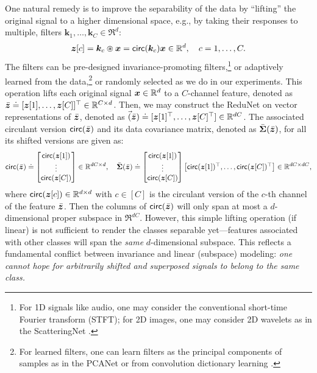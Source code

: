\documentclass[\toplevelprefix/book-main.tex]{subfiles}
\begin{document}
One natural remedy is to improve the separability of the data by ``lifting'' the original signal to a higher dimensional space, e.g., by taking their responses to multiple, filters $\bm k_1, \ldots, \bm k_C \in \Re^d$: 
\begin{equation}
\bm z[c] = \bm k_c \circledast \bm x  =  \mathsf{circ}(\bm k_c) \bm x \in \mathbb{R}^d, \quad c = 1, \ldots, C.
\label{eqn:lift-1d}
\end{equation} 
The filters can be pre-designed invariance-promoting filters,\footnote{For 1D signals like audio, one may consider the conventional short-time Fourier transform (STFT); for 2D images, one may consider 2D wavelets as in the ScatteringNet \cite{scattering-net}.} or adaptively learned from the data,\footnote{For learned filters, one can learn filters as the principal components of samples as in the PCANet \cite{chan2015pcanet} or from convolution dictionary learning \cite{li2019multichannel,qu2019nonconvex}.} or randomly selected as we do in our experiments. This operation lifts each original signal $\bm{x} \in \mathbb{R}^d$ to a $C$-channel feature, denoted as $\bar{\bm{z}}  \doteq [\bm{z}[1], \ldots, \bm{z}[C]]^\top \in \mathbb{R}^{C\times d}$. 
Then, we may construct the ReduNet on vector representations of $\bar{\bm{z}}$, denoted as
$\vec(\bar{\bm{z}}) \doteq [\bm{z}[1]^\top, \ldots, \bm{z}[C]^\top] \in \mathbb{R}^{dC}$. 
The associated circulant version $ \mathsf{circ}(\bar{\bm{z}})$ and its data covariance matrix, denoted as $\bar{\bm \Sigma}(\bar{\bm{z}})$, for all its shifted versions are given as:
\begin{equation}
\begin{aligned}
 \mathsf{circ}(\bar{\bm{z}}) \doteq \left[\begin{matrix}
    \mathsf{circ}(\bm{z}[1])  \\ \vdots \\ \mathsf{circ}(\bm{z}[C]) \end{matrix} \right] \in \mathbb{R}^{dC\times d}, 
    \quad  \bar{\bm \Sigma}(\bar{\bm{z}}) \doteq 
    \left[\begin{matrix}
    \mathsf{circ}(\bm{z}[1]) \\ \vdots \\ \mathsf{circ}(\bm{z}[C]) \end{matrix} \right]
    \left[\begin{matrix}\mathsf{circ}(\bm{z}[1])^\top,\ldots, \mathsf{circ}(\bm{z}[C])^\top\end{matrix} \right] \in \mathbb{R}^{dC\times dC},
    \label{eqn:W-multichannel}
\end{aligned}
\end{equation}
where $\mathsf{circ}(\bm{z}[c]) \in \mathbb{R}^{d\times d}$ with $c \in [C]$ is the circulant version of the $c$-th channel of the feature $\bar {\bm{z}}$. Then the columns of $\mathsf{circ}(\bar{\bm{z}})$  will only span at most a $d$-dimensional proper subspace in $\Re^{dC}$.  However, this simple lifting operation (if linear) is not sufficient to render the classes separable yet---features associated with other classes will span the {\em same} $d$-dimensional subspace. This reflects a fundamental conflict between invariance and linear (subspace) modeling: {\em one cannot hope for arbitrarily shifted and superposed signals to belong to the same class.} 
\end{document}
